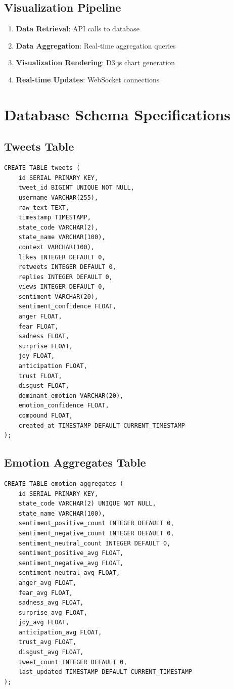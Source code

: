 \subsection{Visualization Pipeline}
\begin{enumerate}
\item \textbf{Data Retrieval}: API calls to database
\item \textbf{Data Aggregation}: Real-time aggregation queries
\item \textbf{Visualization Rendering}: D3.js chart generation
\item \textbf{Real-time Updates}: WebSocket connections
\end{enumerate}


\section{Database Schema Specifications}

\subsection{Tweets Table}
\begin{verbatim}
CREATE TABLE tweets (
    id SERIAL PRIMARY KEY,
    tweet_id BIGINT UNIQUE NOT NULL,
    username VARCHAR(255),
    raw_text TEXT,
    timestamp TIMESTAMP,
    state_code VARCHAR(2),
    state_name VARCHAR(100),
    context VARCHAR(100),
    likes INTEGER DEFAULT 0,
    retweets INTEGER DEFAULT 0,
    replies INTEGER DEFAULT 0,
    views INTEGER DEFAULT 0,
    sentiment VARCHAR(20),
    sentiment_confidence FLOAT,
    anger FLOAT,
    fear FLOAT,
    sadness FLOAT,
    surprise FLOAT,
    joy FLOAT,
    anticipation FLOAT,
    trust FLOAT,
    disgust FLOAT,
    dominant_emotion VARCHAR(20),
    emotion_confidence FLOAT,
    compound FLOAT,
    created_at TIMESTAMP DEFAULT CURRENT_TIMESTAMP
);
\end{verbatim}

\subsection{Emotion Aggregates Table}
\begin{verbatim}
CREATE TABLE emotion_aggregates (
    id SERIAL PRIMARY KEY,
    state_code VARCHAR(2) UNIQUE NOT NULL,
    state_name VARCHAR(100),
    sentiment_positive_count INTEGER DEFAULT 0,
    sentiment_negative_count INTEGER DEFAULT 0,
    sentiment_neutral_count INTEGER DEFAULT 0,
    sentiment_positive_avg FLOAT,
    sentiment_negative_avg FLOAT,
    sentiment_neutral_avg FLOAT,
    anger_avg FLOAT,
    fear_avg FLOAT,
    sadness_avg FLOAT,
    surprise_avg FLOAT,
    joy_avg FLOAT,
    anticipation_avg FLOAT,
    trust_avg FLOAT,
    disgust_avg FLOAT,
    tweet_count INTEGER DEFAULT 0,
    last_updated TIMESTAMP DEFAULT CURRENT_TIMESTAMP
);
\end{verbatim}

